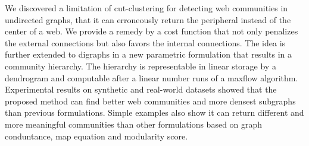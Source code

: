 We discovered a limitation of cut-clustering for detecting web communities in undirected graphs, that it can erroneously return the peripheral instead of the center of a web. We provide a remedy by a cost function that not only penalizes the external connections but also favors the internal connections. The idea is further extended to digraphs in a new parametric formulation that results in a community hierarchy. The hierarchy is representable in linear storage by a dendrogram and computable after a linear number runs of a maxflow algorithm. Experimental results on synthetic and real-world datasets showed that the proposed method can find better web communities and more densest subgraphs than previous formulations. Simple examples also show it can return different and more meaningful communities than other formulations based on graph conduntance, map equation and modularity score.